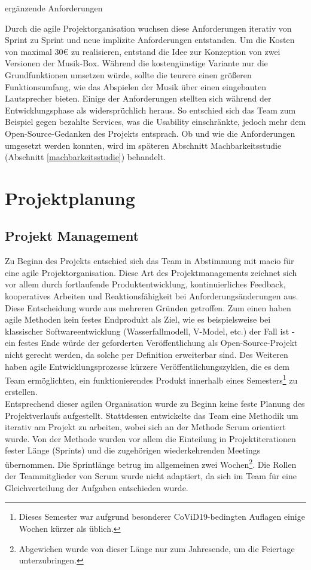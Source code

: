 \documentclass[10pt, a4paper]{article}
\begin{document}
\begin{onehalfspace}
\begin{center}
\begin{table}[h!]
    \caption{\label{erg-anforderungen}ergänzende Anforderungen}
  \end{table}
\end{center}
Durch die agile Projektorganisation wuchsen diese Anforderungen iterativ von Sprint zu Sprint und neue implizite Anforderungen entstanden.
Um die Kosten von maximal 30€ zu realisieren, entstand die Idee zur Konzeption von zwei Versionen der Musik-Box. Während die kostengünstige Variante nur die Grundfunktionen umsetzen würde, sollte die teurere einen größeren Funktionsumfang, wie das Abspielen der Musik über einen eingebauten Lautsprecher bieten.
Einige der Anforderungen stellten sich während der Entwicklungsphase als widersprüchlich heraus.
So entschied sich das Team zum Beispiel gegen bezahlte Services, was die Usability einschränkte, jedoch mehr dem Open-Source-Gedanken des Projekts entsprach.
Ob und wie die Anforderungen umgesetzt werden konnten, wird im späteren Abschnitt Machbarkeitsstudie (Abschnitt \ref{machbarkeitsstudie}) behandelt.

\section{Projektplanung}
  \subsection{Projekt Management}
  Zu Beginn des Projekts entschied sich das Team in Abstimmung mit macio für eine agile Projektorganisation.
  Diese Art des Projektmanagements zeichnet sich vor allem durch fortlaufende Produktentwicklung, kontinuierliches Feedback, kooperatives Arbeiten und
  Reaktionsfähigkeit bei Anforderungsänderungen aus. Diese Entscheidung wurde aus mehreren Gründen getroffen.
  Zum einen haben agile Methoden kein festes Endprodukt als Ziel, wie es beispielsweise bei klassischer Softwareentwicklung
  (Wasserfallmodell, V-Model, etc.) der Fall ist - ein festes Ende würde der geforderten Veröffentlichung als Open-Source-Projekt nicht gerecht werden,
  da solche per Definition erweiterbar sind. Des Weiteren haben agile Entwicklungsprozesse kürzere Veröffentlichungszyklen,
  die es dem Team ermöglichten, ein funktionierendes Produkt innerhalb eines
  Semesters\footnote{Dieses Semester war aufgrund besonderer CoViD19-bedingten Auflagen einige Wochen kürzer als üblich.} zu erstellen.
  \\
  Entsprechend dieser agilen Organisation wurde zu Beginn keine feste Planung des Projektverlaufs aufgestellt.
  Stattdessen entwickelte das Team eine Methodik um iterativ am Projekt zu arbeiten, wobei sich an der Methode Scrum\cite{Scrum} orientiert wurde.
  Von der Methode wurden vor allem die Einteilung in Projektiterationen fester Länge (Sprints) und die zugehörigen wiederkehrenden Meetings übernommen.
  Die Sprintlänge betrug im allgemeinen zwei Wochen\footnote{Abgewichen wurde von dieser Länge nur zum Jahresende, um die Feiertage unterzubringen.}.
  Die Rollen der Teammitglieder von Scrum wurde nicht adaptiert, da sich im Team für eine Gleichverteilung der Aufgaben entschieden wurde.


\end{onehalfspace}
\end{document}
